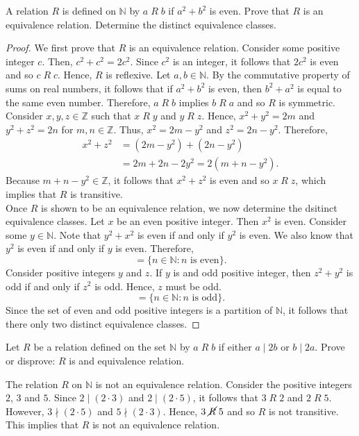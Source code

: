 \documentclass[12pt]{article}
\newcommand{\N}{\mathbb{N}}
\newcommand{\Z}{\mathbb{Z}}
\newenvironment{problem}[2][Problem]{\begin{trivlist}
		\item[\hskip \labelsep {\bfseries #1}\hskip \labelsep {\bfseries #2.}]}{\end{trivlist}}
\newenvironment{solution}[2][Solution]{\begin{trivlist}
		\item[\hskip \labelsep {\bfseries #1}\hskip \labelsep {\bfseries #2.}]}{\end{trivlist}}
\begin{document}
 	\begin{problem}{37}
 		A relation $R$ is defined on $\N$ by $a\; R \; b$ if $a^{2} +b^{2}$ is even. Prove that $R$ is an equivalence relation. Determine the distinct equivalence classes.
 		\begin{proof}
 			We first prove that $R$ is an equivalence relation. Consider some positive integer $c$. Then, $c^{2} + c^{2} = 2c^{2}$. Since $c^{2}$ is an integer, it follows that $2c^{2}$ is even and so $c\; R \; c$. Hence, $R$ is reflexive. Let $a,b\in \N$. By the commutative property of sums on real numbers, it follows that if $a^{2} + b^{2}$ is even, then $b^{2} + a^{2}$ is equal to the same even number. Therefore, $a\; R \; b$ implies $b\; R \; a$ and so $R$ is symmetric. Consider $x,y,z\in \Z$ such that $x\; R \;y$ and $y\; R \; z$. Hence, $x^{2} + y^{2} = 2m$ and $y^{2} + z^{2} = 2n$ for $m,n\in \Z$. Thus, $x^{2} = 2m-y^{2}$ and $z^{2} = 2n-y^{2}$. Therefore,
 			\begin{align*}
 				x^{2} + z^{2} &= (2m-y^{2}) + (2n-y^{2}) \\
 				&= 2m+2n-2y^{2} = 2(m+n-y^{2}).
 			\end{align*}
 		Because $m+n-y^{2} \in \Z$, it follows that $x^{2}+z^{2}$ is even and so $x\; R \;z$, which implies that $R$ is transitive.\\
 		
 		Once $R$ is shown to be an equivalence relation, we now determine the dsitinct equivalence classes. Let $x$ be an even positive integer. Then $x^{2}$ is even. Consider some $y\in \N$. Note that $y^{2}+x^{2}$ is even if and only if $y^{2}$ is even. We also know that $y^{2}$ is even if and only if $y$ is even. Therefore,
 		\begin{equation*}
 			[x] = \{n\in \N: n \text{ is even}\}.
 		\end{equation*} 
 		Consider positive integers $y$ and $z$. If $y$ is and odd positive integer, then $z^{2}+y^{2}$ is odd if and only if $z^{2}$ is odd. Hence, $z$ must be odd.
 		\begin{equation*}
 			[y] = \{n\in \N: n\text{ is odd}\}.
 		\end{equation*}
 		Since the set of even and odd positive integers is a partition of $\N$, it follows that there only two distinct equivalence classes.
 		\end{proof} 
 	\end{problem}
	 
	 \begin{problem}{38}
	 	Let $R$ be a relation defined on the set $\N$ by $a\; R \;b$ if either $a\mid 2b$ or $b\mid 2a$. Prove or disprove: $R$ is and equivalence relation.
	 	\begin{solution}{38}
	 		The relation $R$ on $\N$ is not an equivalence relation. Consider the positive integers $2$, $3$ and $5$. Since $2\mid (2\cdot 3)$ and $2\mid (2\cdot 5)$, it follows that $3\; R \; 2$ and $2\; R \; 5$. However, $3 \nmid (2\cdot 5)$ and $5\nmid (2\cdot 3)$. Hence, $3\; \cancel R \; 5$ and so $R$ is not transitive. This implies that $R$ is not an equivalence relation.
	 	\end{solution}
	 \end{problem}
 
\end{document}

